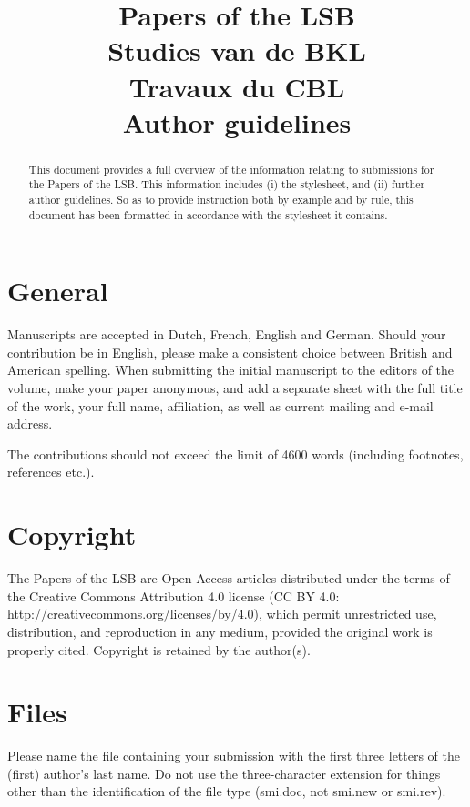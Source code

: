 \documentclass[times,linguex]{lsb}
\title[Author Guidelines]{Papers of the LSB\\ 
Studies van de BKL\\
Travaux du CBL\\
\Large Author guidelines}
\author[Guido Vanden Wyngaerd]%
{
\spauthor{Guido Vanden Wyngaerd \\ 
\institute{KU Leuven}} 
}
\begin{document}
\maketitle

\begin{abstract} \normalsize  This document provides a full overview of the information relating to submissions for the Papers of the LSB. This information includes (i) the stylesheet, and (ii) further author guidelines. So as to provide instruction both by example and by rule, this document has been formatted in accordance with the stylesheet it contains.
\end{abstract}

\clearpage

\section{General}

Manuscripts are accepted in Dutch, French, English and German. Should your contribution be in English, please make a consistent choice between British and American spelling. When submitting the initial manuscript to the editors of the volume, make your paper anonymous, and  add a separate sheet with the full title of the work, your full name, affiliation, as well as current mailing and e-mail address.

The contributions should not exceed the limit of 4600 words (including footnotes, references etc.). 

\section{Copyright}

The Papers of the LSB are Open Access articles distributed under the terms of the Creative Commons Attribution 4.0 license (CC BY 4.0: \url{http://creativecommons.org/licenses/by/4.0}), which permit unrestricted use, distribution, and reproduction in any medium, provided the original work is properly cited. Copyright is retained by the author(s).

\section{Files}

Please name the file containing your submission with the first three letters of the (first) author’s last name. Do not use the three-character extension for things other than the identification of the file type (smi.doc, not smi.new or smi.rev). 
\end{document}
